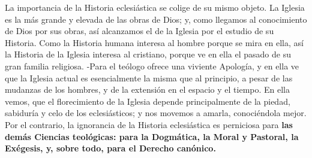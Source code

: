 \raggedbottom{} \documentclass[12pt, a4paper]{book}
\begin{document}
La importancia de la Historia eclesiástica se colige de su mismo objeto. La Iglesia es la más grande y elevada de las obras de Dios; y, como llegamos al conocimiento de Dios por sus obras, así alcanzamos el de la Iglesia por el estudio de su Historia. Como la Historia humana interesa al hombre porque se mira en ella, así la Historia de la Iglesia interesa al cristiano, porque ve en ella el pasado de su gran familia religiosa. -Para el teólogo ofrece una viviente Apología, y en ella ve que la Iglesia actual es esencialmente la misma que al principio, a pesar de las mudanzas de los hombres, y de la extensión en el espacio y el tiempo. En ella vemos, que el florecimiento de la Iglesia depende principalmente de la piedad, sabiduría y celo de los eclesiásticos; y nos movemos a amarla, conociéndola mejor. Por el contrario, la ignorancia de la Historia eclesiástica es perniciosa para \textbf{las demás Ciencias teológicas: para la Dogmática, la Moral y Pastoral, la Exégesis, y, sobre todo, para el Derecho canónico.}
\end{document}
